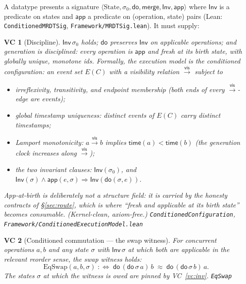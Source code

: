 \documentclass[11pt]{article}
\newtheorem{vc}{VC}
\newcommand{\vis}{\xrightarrow{\mathsf{vis}}}
\newcommand{\lean}[1]{\texttt{#1}}
\newcommand{\st}{\sigma}
\newcommand{\ini}{\st_0}
\newcommand{\dodo}{\mathsf{do}}
\newcommand{\merge}{\mathsf{merge}}
\newcommand{\eqobs}{\approx}
\newcommand{\Inv}{\mathsf{Inv}}
\newcommand{\app}{\mathsf{app}}
\begin{document}
A datatype presents a signature
$\langle \text{State}, \ini, \dodo, \merge, \Inv, \app \rangle$ where $\Inv$ is a predicate
on states and $\app$ a predicate on (operation, state) pairs (Lean:
\lean{ConditionedMRDTSig}, \lean{Framework/MRDTSig.lean}). It must supply:

\begin{vc}[Discipline]\label{vc:disc}
$\Inv\,\ini$ holds; $\dodo$ preserves $\Inv$ on applicable operations; and generation is
disciplined: every operation is $\app$ and \emph{fresh} at its birth state, with globally
unique, monotone ids. Formally, the execution model is the \emph{conditioned
configuration}: an event set $E(C)$ with a visibility relation $\vis$ subject to
\begin{itemize}[leftmargin=2em]
\item[(i)] irreflexivity, transitivity, and endpoint membership (both ends of every
  $\vis$-edge are events);
\item[(ii)] global timestamp uniqueness: distinct events of $E(C)$ carry distinct
  timestamps;
\item[(iii)] Lamport monotonicity: $a \vis b$ implies
  $\mathsf{time}(a) < \mathsf{time}(b)$ (the generation clock increases along
  $\vis$);
\item[(iv)] the two invariant clauses: $\Inv(\ini)$, and
  $\Inv(\st) \wedge \app(e, \st) \Rightarrow \Inv(\dodo(\st, e))$.
\end{itemize}
App-at-birth is deliberately \emph{not} a structure field: it is carried by the
honesty contracts of \S\ref{sec:route}, which is where ``fresh and applicable at its
birth state'' becomes consumable. (Kernel-clean, axiom-free.)
\hfill\lean{ConditionedConfiguration}, \lean{Framework/ConditionedExecutionModel.lean}
\end{vc}

\begin{vc}[Conditioned commutation --- the swap witness]\label{vc:comm}
For concurrent operations $a,b$ and any state $\st$ with $\Inv\,\st$ at which both are
applicable in the relevant reorder sense, the \emph{swap witness} holds:
\[
  \mathrm{EqSwap}(a, b, \st) \;:\Longleftrightarrow\;
  \dodo\,(\dodo\,\st\,a)\,b \;\eqobs\; \dodo\,(\dodo\,\st\,b)\,a .
\]
The states $\st$ at which the witness is owed are pinned by VC~\ref{vc:inv}.
\hfill\lean{EqSwap}
\end{vc}
\end{document}
